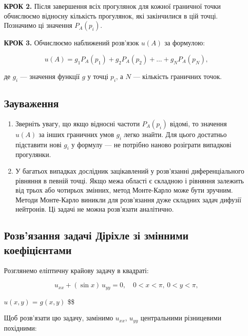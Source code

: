 \documentclass[
  ukrainian,
]{article}
\begin{document}
\textbf{КРОК 2.} Після завершення всіх прогулянок для кожної граничної
точки обчислюємо відносну кількість прогулянок, які закінчилися в цій
точці. Позначимо ці значення \(P_A(p_i)\).

\textbf{КРОК 3.} Обчислюємо наближений розв'язок \(u(A)\) за формулою:

\[
u(A) = g_1 P_A(p_1) + g_2 P_A(p_2) + \dots + g_N P_A(p_N),
\]

де \(g_i\) --- значення функції \(g\) у точці \(p_i\), а \(N\) ---
кількість граничних точок.

\subsection{Зауваження}\label{ux437ux430ux443ux432ux430ux436ux435ux43dux43dux44f-14}

\begin{enumerate}
\def\labelenumi{\arabic{enumi}.}
\item
  Зверніть увагу, що якщо відносні частоти \(P_A(p_i)\) відомі, то
  значення \(u(A)\) за інших граничних умов \(g_i\) легко знайти. Для
  цього достатньо підставити нові \(g_i\) у формулу --- не потрібно
  наново розіграти випадкові прогулянки.
\item
  У багатьох випадках дослідник зацікавлений у розв'язанні
  диференціального рівняння в певній точці. Якщо межа області є складною
  і рівняння залежить від трьох або чотирьох змінних, метод Монте-Карло
  може бути зручним. Методи Монте-Карло виникли для розв'язання дуже
  складних задач дифузії нейтронів. Ці задачі не можна розв'язати
  аналітично.
\end{enumerate}

\subsection{Розв'язання задачі Діріхле зі змінними
коефіцієнтами}\label{ux440ux43eux437ux432ux44fux437ux430ux43dux43dux44f-ux437ux430ux434ux430ux447ux456-ux434ux456ux440ux456ux445ux43bux435-ux437ux456-ux437ux43cux456ux43dux43dux438ux43cux438-ux43aux43eux435ux444ux456ux446ux456ux454ux43dux442ux430ux43cux438}

Розглянемо еліптичну крайову задачу в квадраті:

\[
u_{xx} + (\sin x)\, u_{yy} = 0, \quad 0 < x < \pi,\ 0 < y < \pi,
\]

\(u(x, y)\) = \(g(x, y)\) \quad {}\$\$

Щоб розв'язати цю задачу, замінимо \(u_{xx}\), \(u_{yy}\) центральними
різницевими похідними:
\end{document}
